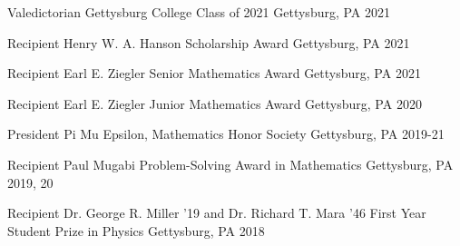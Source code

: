 




\begin{cvhonors}

\cvhonor
{Valedictorian} %
{Gettysburg College Class of 2021} %
{Gettysburg, PA} %
{2021} %


\cvhonor
{Recipient} %
{Henry W. A. Hanson Scholarship Award} %
{Gettysburg, PA} %
{2021} %


\cvhonor
{Recipient} %
{Earl E. Ziegler Senior Mathematics Award} %
{Gettysburg, PA} %
{2021} %


\cvhonor
{Recipient} %
{Earl E. Ziegler Junior Mathematics Award} %
{Gettysburg, PA} %
{2020} %



\cvhonor
{President} %
{Pi Mu Epsilon, Mathematics Honor Society} %
{Gettysburg, PA} %
{2019-21} %


\cvhonor
{Recipient} %
{Paul Mugabi Problem-Solving Award in Mathematics} %
{Gettysburg, PA} %
{2019, 20} %


\cvhonor
{Recipient} %
{Dr. George R. Miller '19 and Dr. Richard T. Mara '46 First Year Student Prize in Physics} %
{Gettysburg, PA} %
{2018} %



\end{cvhonors}
